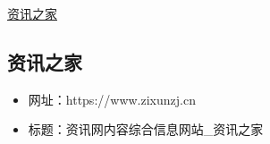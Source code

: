 \href{https://www.zixunzj.cn}{资讯之家}
\subsection{资讯之家}
\begin{itemize}
\item 网址：https://www.zixunzj.cn
\item 标题：资讯网内容综合信息网站_资讯之家
\end{itemize}

